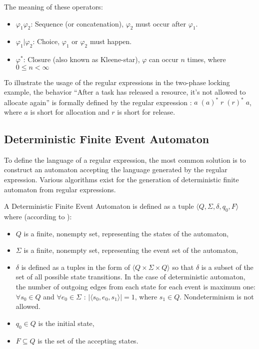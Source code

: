 			The meaning of these operators:
			\begin{itemize}
				\item $\varphi_1 \varphi_2$: Sequence (or concatenation), $\varphi_2$ must occur after $\varphi_1$.
				\item $\varphi_1 | \varphi_2$: Choice, $\varphi_1$ or $\varphi_2$ must happen.
				\item $\varphi^\ast$: Closure (also known as Kleene-star), $\varphi$ can occur $n$ times, where $0 \leq n < \infty$
			\end{itemize}
			
	
			To illustrate the usage of the regular expressions in the two-phase locking example, the behavior ``After a task has released a resource, it's not allowed to allocate again'' is formally defined by the regular expression : $a \; (a)^* \; r \; (r)^* \; a $, where $a$ is short for allocation and $r$ is short for release.
	
	
		\subsection{Deterministic Finite Event Automaton}
			To define the language of a regular expression, the most common solution is to construct an automaton accepting the language generated by the regular expression. Various  algorithms exist for the generation of deterministic finite automaton from regular expressions. 
			
			\begin{dfn}
				\label{dfn:cep:ea}
				A Deterministic Finite Event Automaton is defined as a tuple $\langle Q,\Sigma,\delta,q_0, F \rangle$ where (according to \citep{lam2006compilers}): 
					\begin{itemize}
						\item $Q$ is a finite, nonempty set, representing the states of the automaton,
						\item $\Sigma$ is a finite, nonempty set, representing the event set of the automaton,
						\item $\delta$ is defined as a tuples in the form of $\langle Q \times \Sigma \times Q \rangle$ so that $\delta$ is a subset of the set of all possible state transitions. In the case of deterministic automaton, the number of outgoing edges from each state for each event is maximum one: $\forall s_0 \in Q$ and $\forall e_0 \in \Sigma$ : $|\langle s_0, e_0, s_1 \rangle| = 1$, where $s_1 \in Q$. Nondeterminism is not allowed.
						\item $q_0 \in Q$ is the initial state,
						\item $F \subseteq Q$ is the set of the accepting states.
					\end{itemize}	
			\end{dfn}
		
